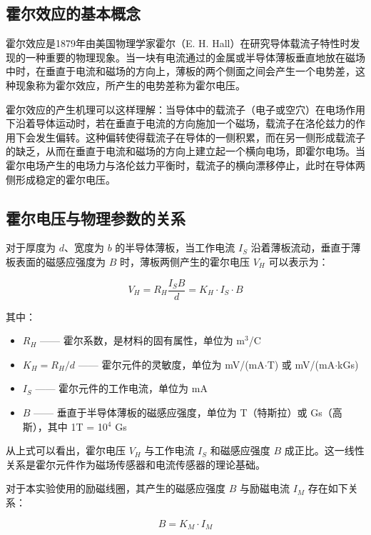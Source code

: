 ﻿\documentclass[12pt,a4paper]{article}
\begin{document}
\subsection{霍尔效应的基本概念}

霍尔效应是1879年由美国物理学家霍尔（E. H. Hall）在研究导体载流子特性时发现的一种重要的物理现象。当一块有电流通过的金属或半导体薄板垂直地放在磁场中时，在垂直于电流和磁场的方向上，薄板的两个侧面之间会产生一个电势差，这种现象称为霍尔效应，所产生的电势差称为霍尔电压。

霍尔效应的产生机理可以这样理解：当导体中的载流子（电子或空穴）在电场作用下沿着导体运动时，若在垂直于电流的方向施加一个磁场，载流子在洛伦兹力的作用下会发生偏转。这种偏转使得载流子在导体的一侧积累，而在另一侧形成载流子的缺乏，从而在垂直于电流和磁场的方向上建立起一个横向电场，即霍尔电场。当霍尔电场产生的电场力与洛伦兹力平衡时，载流子的横向漂移停止，此时在导体两侧形成稳定的霍尔电压。

\subsection{霍尔电压与物理参数的关系}

对于厚度为 $d$、宽度为 $b$ 的半导体薄板，当工作电流 $I_S$ 沿着薄板流动，垂直于薄板表面的磁感应强度为 $B$ 时，薄板两侧产生的霍尔电压 $V_H$ 可以表示为：

\begin{equation}
V_H = R_H \frac{I_S B}{d} = K_H \cdot I_S \cdot B
\end{equation}

其中：
\begin{itemize}
    \item $R_H$ —— 霍尔系数，是材料的固有属性，单位为 m$^3$/C
    \item $K_H = R_H / d$ —— 霍尔元件的灵敏度，单位为 mV/(mA$\cdot$T) 或 mV/(mA$\cdot$kGs)
    \item $I_S$ —— 霍尔元件的工作电流，单位为 mA
    \item $B$ —— 垂直于半导体薄板的磁感应强度，单位为 T（特斯拉）或 Gs（高斯），其中 1T = 10$^4$ Gs
\end{itemize}

从上式可以看出，霍尔电压 $V_H$ 与工作电流 $I_S$ 和磁感应强度 $B$ 成正比。这一线性关系是霍尔元件作为磁场传感器和电流传感器的理论基础。

对于本实验使用的励磁线圈，其产生的磁感应强度 $B$ 与励磁电流 $I_M$ 存在如下关系：

\begin{equation}
B = K_M \cdot I_M
\end{equation}
\end{document}
